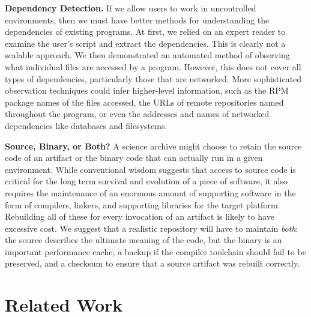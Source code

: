\documentclass{sig-alternate}
\begin{document}
{\bf Dependency Detection.}  If we allow users to work in uncontrolled
environments, then we must have better methods for understanding the dependencies  of existing programs.  At first, we relied on an expert reader to examine
the user's script and extract the dependencies.  This is clearly
not a scalable approach.  We then demonstrated an automated method of observing
what individual files are accessed by a program. However, this does
not cover all types of dependencies, particularly those that are networked.
More sophisticated observation techniques could infer higher-level information,
such as the RPM package names of the files accessed, the URLs of remote
repositories named throughout the program, or even the addresses and names of networked dependencies like databases and filesystems.

{\bf Source, Binary, or Both?}  A science archive might choose to retain
the source code of an artifact or the binary code that can actually run in a given environment.
While conventional wisdom suggests that access to source code is critical for the long term
survival and evolution of a piece of software, it also requires the maintenance of an enormous
amount of supporting software in the form of compilers, linkers, and supporting libraries for
the target platform.  Rebuilding all of these for every invocation of an artifact is
likely to have excessive cost.  We suggest that a realistic repository will have to
maintain \emph{both}: the source describes the ultimate meaning of the code, but
the binary is an important performance cache, a backup if the compiler toolchain should
fail to be preserved, and a checksum to ensure that a source artifact was rebuilt correctly.

\section{Related Work }
\end{document}
